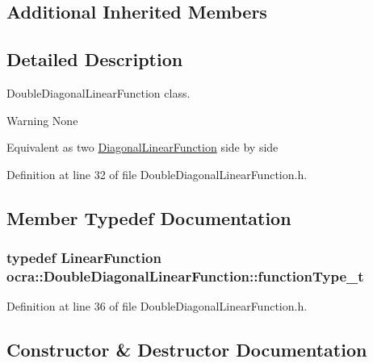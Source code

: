 \subsection*{Additional Inherited Members}


\subsection{Detailed Description}
Double\+Diagonal\+Linear\+Function class. 

\begin{DoxyWarning}{Warning}
None
\end{DoxyWarning}
Equivalent as two \hyperlink{classocra_1_1DiagonalLinearFunction}{Diagonal\+Linear\+Function} side by side 

Definition at line 32 of file Double\+Diagonal\+Linear\+Function.\+h.



\subsection{Member Typedef Documentation}
\subsubsection[{\texorpdfstring{function\+Type\+\_\+t}{functionType_t}}]{\setlength{\rightskip}{0pt plus 5cm}typedef {\bf Linear\+Function} {\bf ocra\+::\+Double\+Diagonal\+Linear\+Function\+::function\+Type\+\_\+t}}\hypertarget{classocra_1_1DoubleDiagonalLinearFunction_a69a17b7aa1e34b31ac1cc18cca3a3b38}{}\label{classocra_1_1DoubleDiagonalLinearFunction_a69a17b7aa1e34b31ac1cc18cca3a3b38}


Definition at line 36 of file Double\+Diagonal\+Linear\+Function.\+h.



\subsection{Constructor \& Destructor Documentation}
